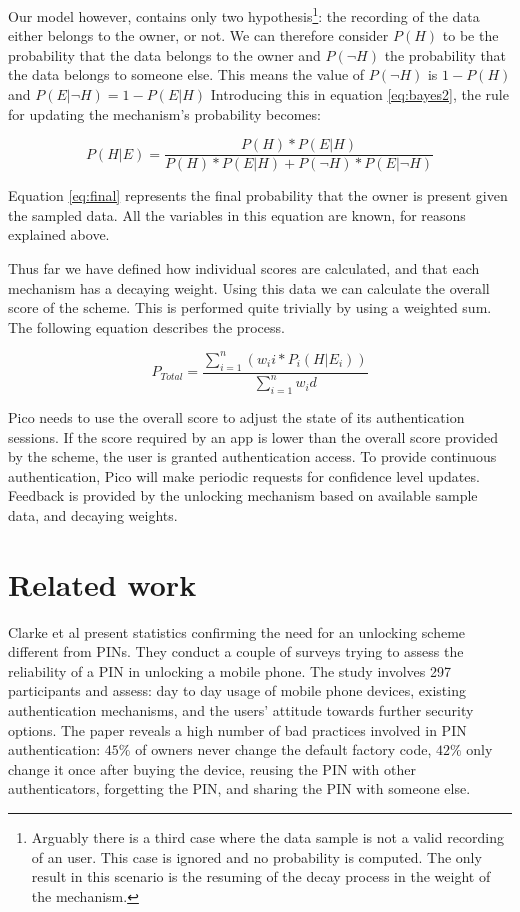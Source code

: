 Our model however, contains only two hypothesis\footnote{Arguably there is a third case where the data sample is not a valid recording of an user. This case is ignored and no probability is computed. The only result in this scenario is the resuming of the decay process in the weight of the mechanism.}: the recording of the data either belongs to the owner, or not. We can therefore consider $P(H)$ to be the probability that the data belongs to the owner and $P(\neg H)$ the probability that the data belongs to someone else. This means the value of $P(\neg H)$ is $1 - P(H)$ and $P(E|\neg H) = 1 - P(E|H)$ Introducing this in equation \ref{eq:bayes2}, the rule for updating the mechanism's probability becomes:

\begin{equation} 
\label{eq:final}
P(H|E) = \frac{P(H) * P(E|H)}{P(H) * P(E|H) + P(\neg H) * P(E|\neg H)}
\end{equation}

Equation \ref{eq:final} represents the final probability that the owner is present given the sampled data. All the variables in this equation are known, for reasons explained above.

Thus far we have defined how individual scores are calculated, and that each mechanism has a decaying weight. Using this data we can calculate the overall score of the scheme. This is performed quite trivially by using a weighted sum. The following equation describes the process. 

\begin{equation} 
\label{eq:overall}
P_{Total} = \frac{\sum_{i=1}^{n}(w_ii * P_i(H|E_i))}{\sum_{i=1}^{n}w_id}
\end{equation}

Pico needs to use the overall score to adjust the state of its authentication sessions. If the score required by an app is lower than the overall score provided by the scheme, the user is granted authentication access. To provide continuous authentication, Pico will make periodic requests for confidence level updates. Feedback is provided by the unlocking mechanism based on available sample data, and decaying weights.

\section{Related work}
Clarke et al \cite{clarke2005authentication} present statistics confirming the need for an unlocking scheme different from PINs. They conduct a couple of surveys trying to assess the reliability of a PIN in unlocking a mobile phone. The study involves 297 participants and assess: day to day usage of mobile phone devices, existing authentication mechanisms, and the users' attitude towards further security options. The paper reveals a high number of bad practices involved in PIN authentication: $45\%$ of owners never change the default factory code, $42\%$ only change it once after buying the device, reusing the PIN with other authenticators, forgetting the PIN, and sharing the PIN with someone else.

